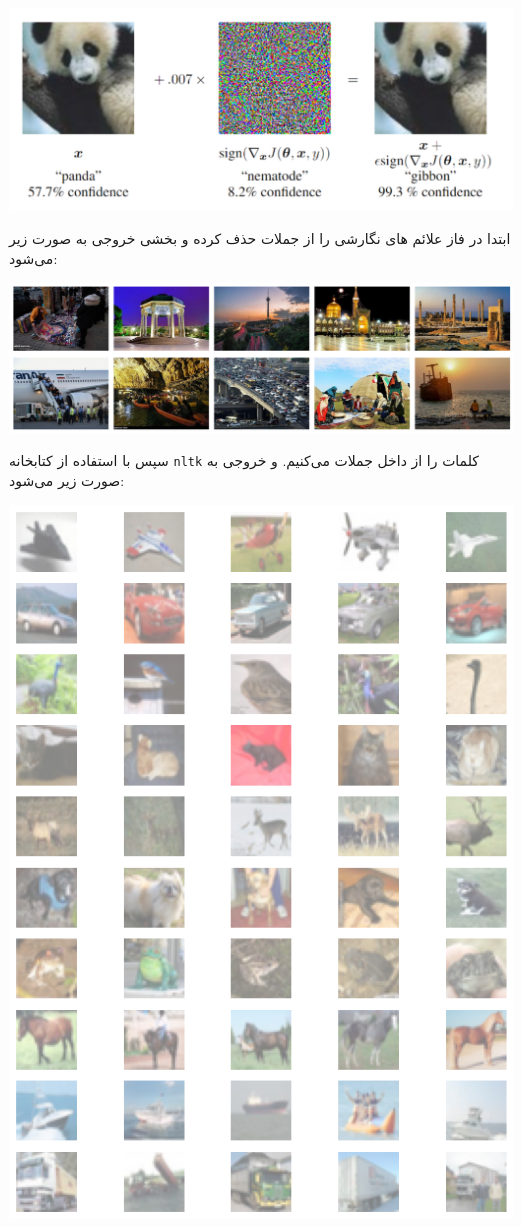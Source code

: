 \begin{qsolve}
	
	\begin{center}
		\includegraphics*[width=0.9\linewidth]{pics/img1.png}
		\label{دیتاست anger}
	\end{center}
	
	
	ابتدا در فاز  علائم های نگارشی را از جملات حذف کرده و بخشی خروجی به صورت زیر می‌شود:
	
	\begin{center}
		\includegraphics*[width=0.7\linewidth]{pics/img2.png}
		\label{دیتاست پس از حذف علائم نگارشی}
	\end{center}
	
	سپس با استفاده از کتابخانه \texttt{nltk} کلمات را از داخل جملات  می‌کنیم. و خروجی به صورت زیر می‌شود:
	
	\begin{center}
		\includegraphics*[width=0.7\linewidth]{pics/img3.png}
		\label{جملات توکنایز شده}
	\end{center}
	

\end{qsolve}
